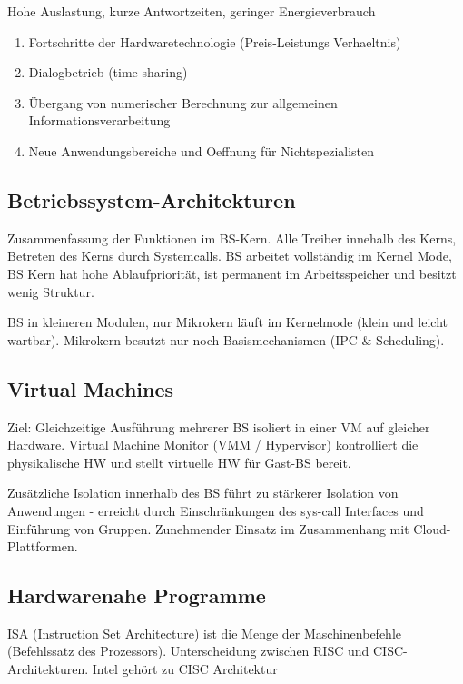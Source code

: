 Hohe Auslastung, kurze Antwortzeiten, geringer Energieverbrauch

\begin{enumerate}
	\setlength\itemsep{0em}
	\item Fortschritte der Hardwaretechnologie (Preis-Leistungs Verhaeltnis)
	\item Dialogbetrieb (time sharing)
	\item Übergang von numerischer Berechnung zur allgemeinen Informationsverarbeitung
	\item Neue Anwendungsbereiche und Oeffnung für Nichtspezialisten
\end{enumerate}

\subsection{Betriebssystem-Architekturen}
Zusammenfassung der Funktionen im BS-Kern. Alle Treiber innehalb des Kerns, Betreten des Kerns durch Systemcalls. BS arbeitet vollständig im Kernel Mode, BS Kern hat hohe Ablaufpriorität, ist permanent im Arbeitsspeicher und besitzt wenig Struktur.

BS in kleineren Modulen, nur Mikrokern läuft im Kernelmode (klein und leicht wartbar). Mikrokern besutzt nur noch Basismechanismen (IPC \& Scheduling).

\subsection{Virtual Machines}
Ziel: Gleichzeitige Ausführung mehrerer BS isoliert in einer VM auf gleicher Hardware. Virtual Machine Monitor (VMM / Hypervisor) kontrolliert die physikalische HW und stellt virtuelle HW für Gast-BS bereit.

Zusätzliche Isolation innerhalb des BS führt zu stärkerer Isolation von Anwendungen - erreicht durch Einschränkungen des sys-call Interfaces und Einführung von Gruppen. Zunehmender Einsatz im Zusammenhang mit Cloud-Plattformen.

\subsection{Hardwarenahe Programme}
ISA (Instruction Set Architecture) ist die Menge der Maschinenbefehle (Befehlssatz des Prozessors). Unterscheidung zwischen RISC und CISC-Architekturen. Intel gehört zu CISC Architektur

